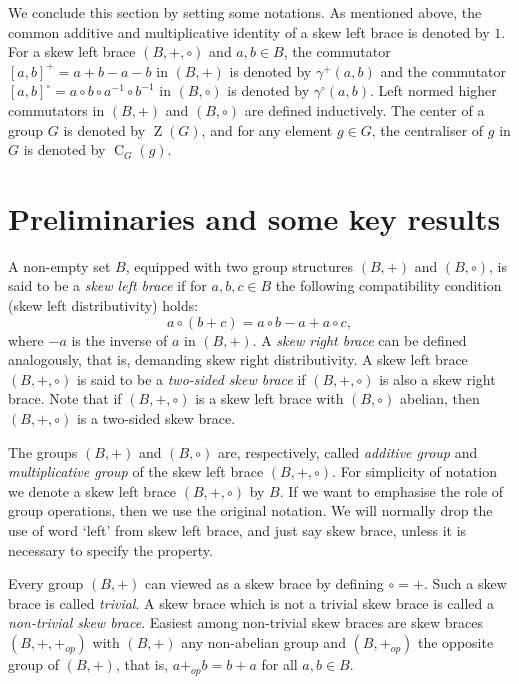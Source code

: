 \documentclass[oneside]{amsart}
\numberwithin{equation}{section}
\theoremstyle{plain}
\theoremstyle{definition}
\newcommand{\C}{\operatorname{C} }
\newcommand{\Z}{\operatorname{Z} }
\begin{document}
We conclude this section by setting some notations. As mentioned above, the common additive and multiplicative identity of a skew left  brace is denoted by $1$. For a skew left brace $(B, +, \circ)$ and $a, b \in B$, the commutator $[a, b]^+ = a+b-a-b$ in $(B, +)$ is denoted by $\gamma^+(a, b)$ and the commutator $[a, b]^{\circ} = a\circ b \circ a^{-1} \circ b^{-1}$ in $(B, \circ)$ is denoted by $\gamma^{\circ}(a, b)$. Left normed higher commutators in $(B, +)$ and $(B, \circ)$ are defined inductively. The center of a group $G$ is denoted by $\Z(G)$, and for any element $g \in G$, the centraliser of $g$ in $G$ is denoted by $\C_G(g)$. 

 
 
 
 
\section{Preliminaries and some key results}

A non-empty set $B$, equipped with two group structures  $(B,+)$ and $(B, \circ)$, is  said to be a {\it skew left brace} if for $a, b, c \in B$ the following compatibility condition (skew left distributivity) holds:
 $$a \circ (b + c) = a \circ b - a + a \circ c,$$
 where $-a$ is the inverse of $a$ in $(B, +)$. A {\it skew right brace} can be defined analogously, that is, demanding  skew right distributivity.
 A skew left brace $(B, +, \circ)$ is said to be a {\it two-sided skew brace} if $(B, +, \circ)$ is also  a skew right brace.   Note that if $(B, +, \circ)$ is a skew left brace with $(B, \circ)$ abelian, then $(B, +, \circ)$ is a two-sided skew brace.  
 
The groups $(B,+)$ and $(B,\circ)$ are, respectively, called  {\it additive group} and {\it multiplicative group} of the skew left brace $(B, +, \circ)$.  For simplicity of notation we denote a skew left brace $(B, +, \circ)$ by $B$. If we want to emphasise the role of  group operations, then we use the original notation.   We will normally drop the use of word `left' from skew left brace, and just say  skew brace, unless it is necessary to specify the property.

Every group $(B, +)$ can viewed as a skew  brace by defining $\circ = +$. Such a skew brace is called \emph{trivial}. A skew brace which is not a trivial skew brace is called a \emph{non-trivial skew brace}.
 Easiest among non-trivial skew braces are skew braces $(B, +, +_{op})$ with $(B, +)$ any non-abelian group and $(B, +_{op})$  the opposite group of $(B, +)$, that is, $a +_{op} b = b + a$ for all $a, b \in B$.
\end{document}
